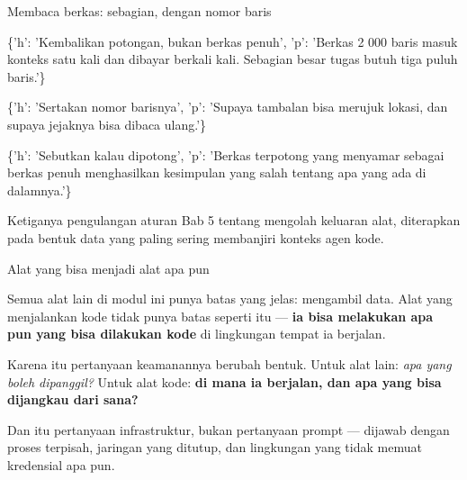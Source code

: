 \documentclass[aspectratio=169,11pt,t]{beamer}
\begin{document}
\begin{frame}[shrink=25]{Membaca berkas: sebagian, dengan nomor baris}
\begin{isteps}
\item \{'h': 'Kembalikan potongan, bukan berkas penuh', 'p': 'Berkas 2 000 baris masuk konteks satu kali dan dibayar berkali kali. Sebagian besar tugas butuh tiga puluh baris.'\}
\item \{'h': 'Sertakan nomor barisnya', 'p': 'Supaya tambalan bisa merujuk lokasi, dan supaya jejaknya bisa dibaca ulang.'\}
\item \{'h': 'Sebutkan kalau dipotong', 'p': 'Berkas terpotong yang menyamar sebagai berkas penuh menghasilkan kesimpulan yang salah tentang apa yang ada di dalamnya.'\}
\end{isteps}
\begin{iband}[signal]
Ketiganya pengulangan aturan Bab 5 tentang mengolah keluaran alat, diterapkan pada bentuk data yang paling sering membanjiri konteks agen kode.
\end{iband}
\end{frame}


\begin{frame}[shrink=25]{Alat yang bisa menjadi alat apa pun}
{\fontsize{9.4}{12.6}\selectfont\color{fg2}Semua alat lain di modul ini punya batas yang jelas:  mengambil data. Alat yang menjalankan kode tidak punya batas seperti itu --- \textbf{ia bisa melakukan apa pun yang bisa dilakukan kode} di lingkungan tempat ia berjalan.\par}\vskip 4pt
\begin{iband}[signal]
Karena itu pertanyaan keamanannya berubah bentuk. Untuk alat lain: \textit{apa yang boleh dipanggil?} Untuk alat kode: \textbf{di mana ia berjalan, dan apa yang bisa dijangkau dari sana?}
\end{iband}
{\fontsize{9.4}{12.6}\selectfont\color{fg2}Dan itu pertanyaan infrastruktur, bukan pertanyaan prompt --- dijawab dengan proses terpisah, jaringan yang ditutup, dan lingkungan yang tidak memuat kredensial apa pun.\par}\vskip 4pt
\end{frame}
\end{document}
